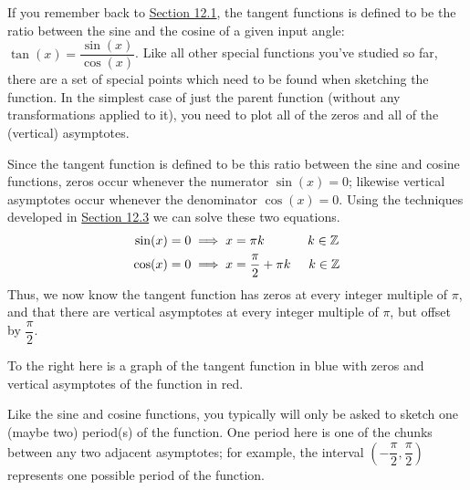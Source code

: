 \documentclass[../book.tex]{subfiles}
\begin{document}
If you remember back to \hyperlink{section.12.1}{Section 12.1}, the tangent functions is defined to be the ratio between the sine and the cosine of a given input angle: $\tan(x)=\dfrac{\sin(x)}{\cos(x)}$. Like all other special functions you've studied so far, there are a set of special points which need to be found when sketching the function. In the simplest case of just the parent function (without any transformations applied to it), you need to plot all of the zeros and all of the (vertical) asymptotes.

Since the tangent function is defined to be this ratio between the sine and cosine functions, zeros occur whenever the numerator $\sin⁡(x)=0$; likewise vertical asymptotes occur whenever the denominator $\cos⁡(x)=0$. Using the techniques developed in \hyperlink{section.12.3}{Section 12.3} we can solve these two equations. \begin{align*}
    \sin(x)=0 &\implies x=\pi k \hspace{12mm} k\in\mathbb{Z}\\ \cos(x)=0 &\implies x=\dfrac{\pi}{2}+\pi k \hspace{5mm} k\in\mathbb{Z}
\end{align*}
Thus, we now know the tangent function has zeros at every integer multiple of $\pi$, and that there are vertical asymptotes at every integer multiple of $\pi$, but offset by $\dfrac{\pi}{2}$.
\begin{wrapfigure}{r}{5cm}
\end{wrapfigure}
To the right here is a graph of the tangent function in blue with zeros and vertical asymptotes of the function in red.

\begin{note}
Like the sine and cosine functions, you typically will only be asked to sketch one (maybe two) period(s) of the function. One period here is one of the chunks between any two adjacent asymptotes; for example, the interval $\left(-\dfrac{\pi}{2},\dfrac{\pi}{2}\right)$ represents one possible period of the function.
\end{note}
\end{document}
